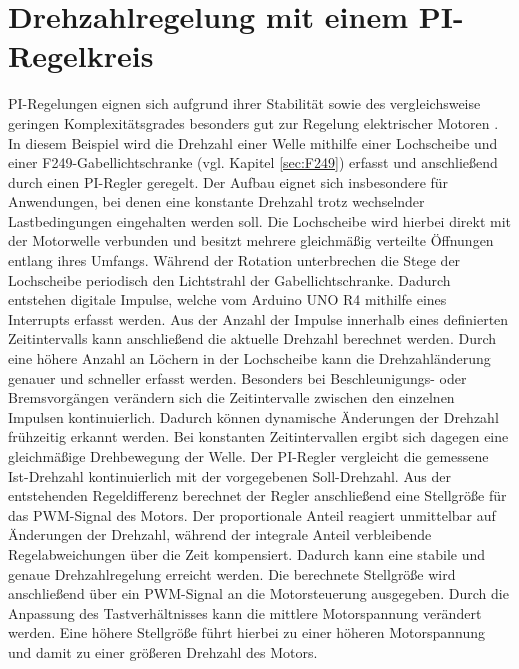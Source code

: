 \section{Drehzahlregelung mit einem PI-Regelkreis}
PI-Regelungen eignen sich aufgrund ihrer Stabilität sowie des vergleichsweise geringen Komplexitätsgrades besonders gut zur Regelung elektrischer Motoren \cite{Lunze:2020}. In diesem Beispiel wird die Drehzahl einer Welle mithilfe einer Lochscheibe und einer F249-Gabellichtschranke (vgl. Kapitel \ref{sec:F249}) erfasst und anschließend durch einen PI-Regler geregelt. Der Aufbau eignet sich insbesondere für Anwendungen, bei denen eine konstante Drehzahl trotz wechselnder Lastbedingungen eingehalten werden soll.
Die Lochscheibe wird hierbei direkt mit der Motorwelle verbunden und besitzt mehrere gleichmäßig verteilte Öffnungen entlang ihres Umfangs. Während der Rotation unterbrechen die Stege der Lochscheibe periodisch den Lichtstrahl der Gabellichtschranke. Dadurch entstehen digitale Impulse, welche vom Arduino UNO R4 mithilfe eines Interrupts erfasst werden. Aus der Anzahl der Impulse innerhalb eines definierten Zeitintervalls kann anschließend die aktuelle Drehzahl berechnet werden.
Durch eine höhere Anzahl an Löchern in der Lochscheibe kann die Drehzahländerung genauer und schneller erfasst werden. Besonders bei Beschleunigungs- oder Bremsvorgängen verändern sich die Zeitintervalle zwischen den einzelnen Impulsen kontinuierlich. Dadurch können dynamische Änderungen der Drehzahl frühzeitig erkannt werden. Bei konstanten Zeitintervallen ergibt sich dagegen eine gleichmäßige Drehbewegung der Welle.
Der PI-Regler vergleicht die gemessene Ist-Drehzahl kontinuierlich mit der vorgegebenen Soll-Drehzahl. Aus der entstehenden Regeldifferenz berechnet der Regler anschließend eine Stellgröße für das PWM-Signal des Motors. Der proportionale Anteil reagiert unmittelbar auf Änderungen der Drehzahl, während der integrale Anteil verbleibende Regelabweichungen über die Zeit kompensiert. Dadurch kann eine stabile und genaue Drehzahlregelung erreicht werden.
Die berechnete Stellgröße wird anschließend über ein PWM-Signal an die Motorsteuerung ausgegeben. Durch die Anpassung des Tastverhältnisses kann die mittlere Motorspannung verändert werden. Eine höhere Stellgröße führt hierbei zu einer höheren Motorspannung und damit zu einer größeren Drehzahl des Motors.



